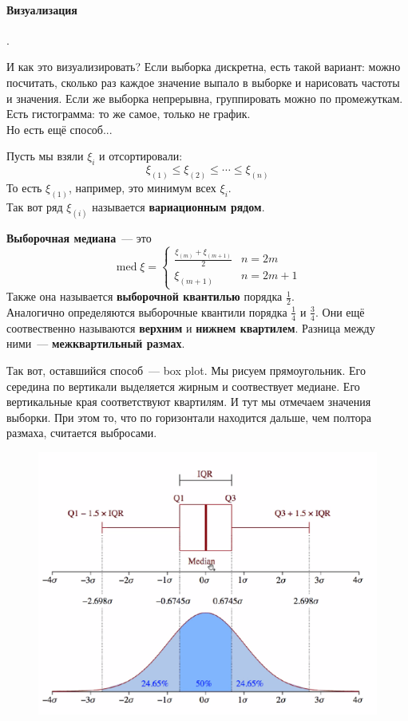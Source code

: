 \documentclass{article}
\begin{document}
    \paragraph{Визуализация}.
    \begin{remark}
        И как это визуализировать? Если выборка дискретна, есть такой вариант: можно посчитать, сколько раз каждое значение выпало в выборке и нарисовать частоты и значения. Если же выборка непрерывна, группировать можно по промежуткам.\\
        Есть гистограмма: то же самое, только не график.\\
        Но есть ещё способ...
    \end{remark}
    \begin{definition}
        Пусть мы взяли $\xi_i$ и отсортировали:
        \[
        \xi_{(1)}\leqslant\xi_{(2)}\leqslant\cdots\leqslant\xi_{(n)}
        \]
        То есть $\xi_{(1)}$, например, это минимум всех $\xi_i$.\\
        Так вот ряд $\xi_{(i)}$ называется \textbf{вариационным рядом}.
    \end{definition}
    \begin{definition}
        \textbf{Выборочная медиана}~--- это
        \[\operatorname{med}\xi=\begin{cases}
            \frac{\xi_{(m)}+\xi_{(m+1)}}2 & n=2m\\
            \xi_{(m+1)} & n=2m+1
        \end{cases}\]
        Также она называется \textbf{выборочной квантилью} порядка $\frac12$.\\
        Аналогично определяются выборочные квантили порядка $\frac14$ и $\frac34$. Они ещё соотвественно называются \textbf{верхним} и \textbf{нижнем квартилем}. Разница между ними~--- \textbf{межквартильный размах}.
    \end{definition}
    \begin{remark}
        Так вот, оставшийся способ~--- box plot. Мы рисуем прямоугольник. Его середина по вертикали выделяется жирным и соотвествует медиане. Его вертикальные края соответствуют квартилям. И тут мы отмечаем значения выборки. При этом то, что по горизонтали находится дальше, чем полтора размаха, считается выбросами.
        \begin{figure}[H]
            \centering
            \includegraphics[width=0.7\linewidth]{Images/BoxPlotExample}
            \label{fig:boxplotexample}
        \end{figure}
    \end{remark}
\end{document}
